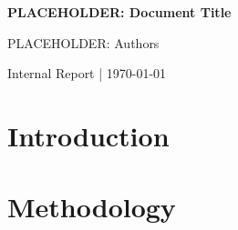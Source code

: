 \documentclass[12pt]{article}
\begin{document}
\begin{center}
{\Large \textbf{PLACEHOLDER: Document Title}}

\medskip

PLACEHOLDER: Authors

\medskip

{\small Internal Report \hspace{1em}|\hspace{1em} \today}
\end{center}


\section{Introduction}\label{sec:intro}




\section{Methodology}\label{sec:method}






\end{document}
